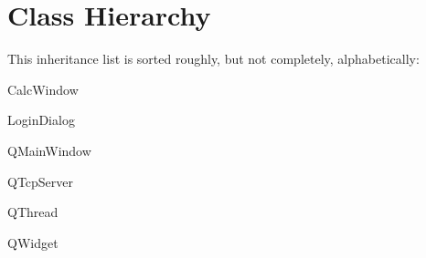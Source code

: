 \section{Class Hierarchy}
This inheritance list is sorted roughly, but not completely, alphabetically\+:\begin{DoxyCompactList}
\item Calc\+Window\begin{DoxyCompactList}
\item {}
\end{DoxyCompactList}
\item {}
\begin{DoxyCompactList}
\item {}
\end{DoxyCompactList}
\item Login\+Dialog\begin{DoxyCompactList}
\item {}
\end{DoxyCompactList}
\item Q\+Main\+Window\begin{DoxyCompactList}
\item {}
\end{DoxyCompactList}
\item Q\+Tcp\+Server\begin{DoxyCompactList}
\item {}
\end{DoxyCompactList}
\item Q\+Thread\begin{DoxyCompactList}
\item {}
\end{DoxyCompactList}
\item Q\+Widget\begin{DoxyCompactList}
\item {}
\item {}
\end{DoxyCompactList}

\end{DoxyCompactList}
